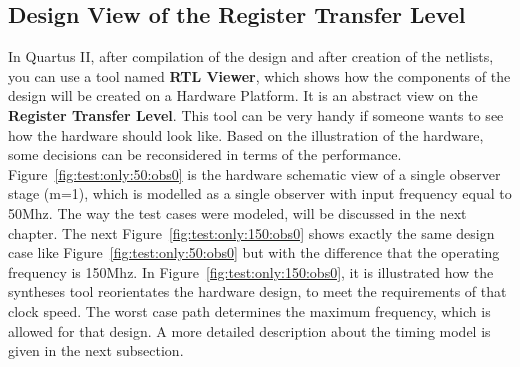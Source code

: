 \subsection{Design View of the Register Transfer Level}
\label{chapter:3:section:2:sub:1}
In Quartus II, after compilation of the design and after creation of the netlists, you can use a tool named \textbf{RTL Viewer}, 
which shows how the components of the design will be created on a Hardware Platform. 
It is an abstract view on the \textbf{Register Transfer Level}. 
This tool can be very handy if someone wants to see how the hardware should look like. 
Based on the illustration of the hardware, some decisions can be reconsidered in terms of the performance. \newline
Figure~\ref{fig:test:only:50:obs0} is the hardware schematic view of a single observer stage (m=1), which is modelled as a single observer with input frequency equal to 50Mhz. 
The way the test cases were modeled, will be discussed in the next chapter. 
The next Figure~\ref{fig:test:only:150:obs0} shows exactly the same design case like Figure~\ref{fig:test:only:50:obs0} but with the difference that the operating frequency is 150Mhz. 
In Figure~\ref{fig:test:only:150:obs0}, it is illustrated how the syntheses tool reorientates the hardware design, 
to meet the requirements of that clock speed. The worst case path determines the maximum frequency, which is allowed for that design. 
A more detailed description about the timing model is given in the next subsection. 
